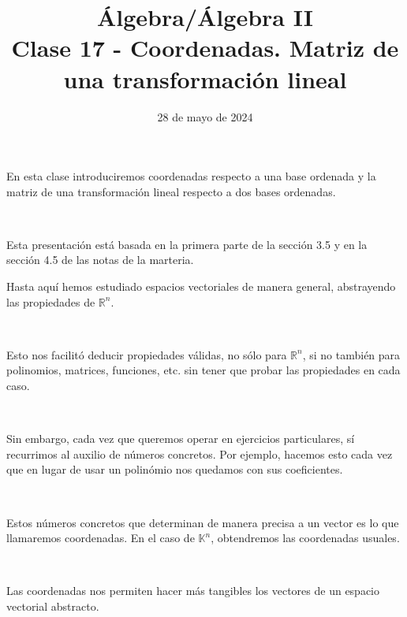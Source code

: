 \documentclass[handout]{beamer} %
\title[Clase 17 - Coordenadas. Matriz de una transformación lineal]{Álgebra/Álgebra II \\ Clase 17 - Coordenadas. Matriz de una transformación lineal}
\author[]{}
\institute[]{\normalsize FAMAF / UNC
	\\[\baselineskip] ${}^{}$
	\\[\baselineskip]
}
\date[28/05/2024]{28 de mayo de 2024}
\newcommand{\R}{\mathbb R}
\newcommand{\K}{\mathbb K}
\begin{document}
\begin{frame}
\maketitle
\end{frame}



\begin{frame}

    En esta clase introduciremos coordenadas respecto a una base ordenada y la matriz de una transformación lineal respecto a dos bases ordenadas.\pause
    
    \
    
    Esta presentación está basada  en la primera parte de la sección 3.5 y en la sección 4.5 de las notas de la marteria.\pause
    \
    
    \end{frame}
    
    
        \begin{frame}
        
        Hasta aquí hemos estudiado espacios vectoriales de manera general, abstrayendo las propiedades de $\R^n$.\pause
        
        \
        
        Esto nos facilitó deducir propiedades válidas, no sólo para $\R^n$, si no también para polinomios, matrices, funciones, etc. sin tener que probar las propiedades en cada caso.\pause
        
        \
        
        Sin embargo, cada vez que queremos operar en ejercicios particulares, sí recurrimos al auxilio de números concretos. Por ejemplo, hacemos esto cada vez que en lugar de usar un polinómio nos quedamos con sus coeficientes.\pause
        
        \
        
        Estos números concretos que determinan de manera precisa a un vector es lo que llamaremos coordenadas. En el caso de $\K^n$, obtendremos las coordenadas usuales.\pause
        
        \
        
        Las coordenadas nos permiten hacer más tangibles los vectores de un espacio vectorial abstracto.
        \end{frame}
        
\end{document}
